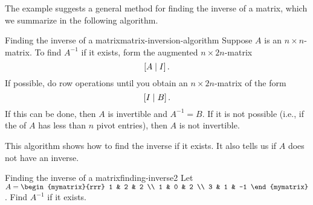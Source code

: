 The example suggests a general method for finding the inverse of a
matrix, which we summarize in the following algorithm.

\begin{algorithm}{Finding the inverse of a matrix}{matrix-inversion-algorithm}
  Suppose $A$ is an $n\times n$-matrix. To find $A^{-1}$ if it
  exists, form the augmented
  $n\times 2n$-matrix
  \begin{equation*}
    \left[A\mid I\right].
  \end{equation*}
  If possible, do row operations until you obtain an
  $n\times 2n$-matrix of the form
  \begin{equation*}
    \left[I\mid B\right].
  \end{equation*}
  If this can be done, then $A$ is invertible and $A^{-1}=B$. If it is
  not possible (i.e., if the {\rref} of $A$ has less than
  $n$ pivot entries), then $A$ is not invertible.
\end{algorithm}

This algorithm shows how to find the inverse if it exists. It also
tells us if $A$ does not have an inverse.

\begin{example}{Finding the inverse of a matrix}{finding-inverse2}
  Let $A=\begin{mymatrix}{rrr}
    1 & 2 & 2 \\
    1 & 0 & 2 \\
    3 & 1 & -1
  \end{mymatrix}$. Find $A^{-1}$ if it exists.
\end{example}

